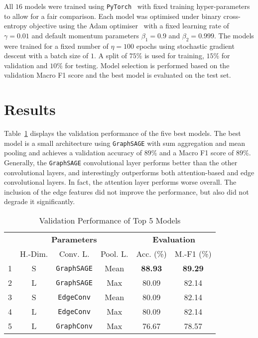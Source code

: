 \documentclass[10pt,conference,compsocconf]{IEEEtran}
\begin{document}
All $16$ models were trained using \texttt{PyTorch}~\cite{torch} with fixed
training hyper-parameters to allow for a fair comparison. Each model was
optimised under binary cross-entropy objective using the Adam
optimiser~\cite{adam} with a fixed learning rate of $\gamma = 0.01$ and default
momentum parameters $\beta_1 = 0.9$ and $\beta_2 = 0.999$. The models were
trained for a fixed number of $\eta=100$ epochs using stochastic gradient
descent with a batch size of $1$. A split of $75\%$ is used for training, $15\%$
for validation and $10\%$ for testing. Model selection is performed based on the
validation Macro F1 score and the best model is evaluated on the test set.

\section{Results}

Table~\ref{tab:results} displays the validation performance of the five best
models. The best model is a small architecture using \texttt{GraphSAGE} with sum
aggregation and mean pooling and achieves a validation accuracy of $89\%$ and a
Macro F1 score of $89\%$. Generally, the \texttt{GraphSAGE} convolutional layer
performs better than the other convolutional layers, and interestingly
outperforms both attention-based and edge convolutional layers. In fact, the
attention layer performs worse overall. The inclusion of the edge features did
not improve the performance, but also did not degrade it significantly.

\begin{table}[ht]
  \centering
  \begin{tabular}{lccccc}
    \toprule
    & 
    \multicolumn{3}{c}{\textbf{Parameters}} &
    \multicolumn{2}{c}{\textbf{Evaluation}} \\
    & H.-Dim. & Conv. L. & Pool. L. & Acc. (\%) & M.-F1 (\%) \\
    \midrule
    1 & S & \texttt{GraphSAGE} & Mean & \textbf{88.93} & \textbf{89.29} \\
    2 & L & \texttt{GraphSAGE} & Max & 80.09 & 82.14 \\
    3 & S & \texttt{EdgeConv} & Mean & 80.09 & 82.14 \\
    4 & L & \texttt{EdgeConv} & Max & 80.09 & 82.14 \\
    5 & L & \texttt{GraphConv} & Max & 76.67 & 78.57 \\
    \bottomrule
  \end{tabular}
  \caption{Validation Performance of Top 5 Models}
  \label{tab:results}
\end{table}
\end{document}

